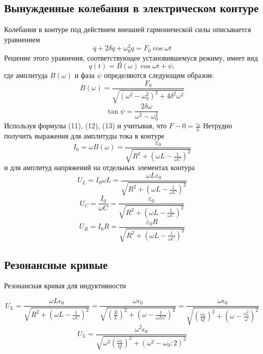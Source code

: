 \subsection{Вынужденные колебания в электрическом контуре} %
Колебания в контуре под действием внешней гармонической силы описывается уравнением
\begin{equation}
	\ddot{q}+2\delta\dot{q}+\omega_0^2 q= F_0\cos{\omega t}
\end{equation}
Решение этого уравнения, соответствующее установившемуся режиму, имеет вид
\begin{equation}
	q(t)=B(\omega)\cos{\omega t+\psi},
\end{equation}
где амплитуда $B(\omega)$ и фаза $\psi$ определяются следующим образом:
\begin{equation}
	B(\omega)=\frac{F_0}{\sqrt{(\omega^2-\omega_0^2)^2+4\delta^2\omega^2}}
\end{equation}
\begin{equation}
	\tan{\psi}=\frac{2\delta\omega}{\omega^2-\omega_0^2}
\end{equation}
	Используя формулы (11), (12), (13) и учитывая, что $F-0=\frac{\varepsilon_0}{L}$
Нетрудно получить выражения для амплитуды тока в контуре
\begin{equation}
	I_0=\omega B(\omega)=\frac{\varepsilon_0}{\sqrt{R^2+(\omega L-\frac{1}{\omega C})^2}}
\end{equation}
и для амплитуд напряжений на отдельных элементах контура
\begin{equation}
	U_L=I_0\omega L=\frac{\omega L\varepsilon_0}{\sqrt{R^2+(\omega L-\frac{1}{\omega C})^2}}
\end{equation}
\begin{equation}
	U_C=\frac{I_0}{\omega C}=\frac{\varepsilon_0}{\sqrt{R^2+(\omega L-\frac{1}{\omega C})^2}}
\end{equation}
\begin{equation}
	U_R=I_0R=\frac{\varepsilon_0R}{\sqrt{R^2+(\omega L-\frac{1}{\omega C})^2}}
\end{equation}

\subsection{Резонансные кривые}
\begin{center}
Резонансная кривая для индуктивности
\end{center}
\begin{equation}
	U_L=\frac{\omega L\epsilon_0}
			{\sqrt{R^2+(\omega L-\frac{1}{\omega C})^2}}=
		\frac{\omega \epsilon_0}
			{\sqrt{(\frac{R}{L})^2+(\omega -\frac{1}{\omega LC})^2}}=
		\frac{\omega \epsilon_0}
			{\sqrt{(\frac{\omega_0}{Q})^2+(\omega -\frac{\omega_0^2}{\omega})^2}}
		\end{equation}
\begin{equation}
	U_L=\frac{\omega^2 \epsilon_0}{\sqrt{\omega^2(\frac{\omega_0}{Q})^2+(\omega^2 -\omega_0:2)^2}}			
\end{equation}			



